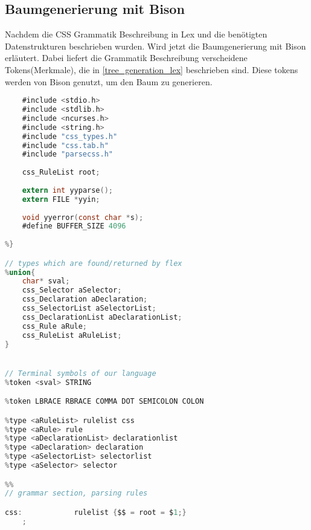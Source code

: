 \subsection{Baumgenerierung mit Bison}
Nachdem die CSS Grammatik Beschreibung in Lex und die benötigten Datenstrukturen beschrieben wurden. Wird jetzt die Baumgenerierung mit Bison erläutert. Dabei liefert die Grammatik Beschreibung verscheidene Tokens(Merkmale), die in \ref{tree_generation_lex} beschrieben sind. Diese tokens werden von Bison genutzt, um den Baum zu generieren. 
\begin{lstlisting}[label=css_biso,language=C, caption=Baumgenerierung mit Bison]
%{
    #include <stdio.h>
    #include <stdlib.h>
    #include <ncurses.h>
    #include <string.h>
    #include "css_types.h"
    #include "css.tab.h"
    #include "parsecss.h"
        
    css_RuleList root; 
	
    extern int yyparse();
    extern FILE *yyin;
    
    void yyerror(const char *s);
	#define BUFFER_SIZE 4096
	
%}

// types which are found/returned by flex 
%union{
    char* sval;
    css_Selector aSelector;
    css_Declaration aDeclaration;
    css_SelectorList aSelectorList;
    css_DeclarationList aDeclarationList;
    css_Rule aRule;
    css_RuleList aRuleList;
}


// Terminal symbols of our language
%token <sval> STRING

%token LBRACE RBRACE COMMA DOT SEMICOLON COLON

%type <aRuleList> rulelist css
%type <aRule> rule
%type <aDeclarationList> declarationlist
%type <aDeclaration> declaration
%type <aSelectorList> selectorlist
%type <aSelector> selector

%%
// grammar section, parsing rules

css:			rulelist {$$ = root = $1;}
	;


\end{lstlisting}
